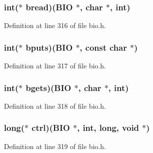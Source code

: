 \subsubsection[{\texorpdfstring{bread}{bread}}]{\setlength{\rightskip}{0pt plus 5cm}int($\ast$ bread)({\bf B\+IO} $\ast$, char $\ast$, int)}\hypertarget{structbio__method__st_a11da462f309fae57ae2132ae6ded814f}{}\label{structbio__method__st_a11da462f309fae57ae2132ae6ded814f}


Definition at line 316 of file bio.\+h.

\subsubsection[{\texorpdfstring{bputs}{bputs}}]{\setlength{\rightskip}{0pt plus 5cm}int($\ast$ bputs)({\bf B\+IO} $\ast$, const char $\ast$)}\hypertarget{structbio__method__st_a5d479bf01f29d87cd8bcc2dd72dede43}{}\label{structbio__method__st_a5d479bf01f29d87cd8bcc2dd72dede43}


Definition at line 317 of file bio.\+h.

\subsubsection[{\texorpdfstring{bgets}{bgets}}]{\setlength{\rightskip}{0pt plus 5cm}int($\ast$ bgets)({\bf B\+IO} $\ast$, char $\ast$, int)}\hypertarget{structbio__method__st_a784cc94a819cc79e25adf02ce34c762b}{}\label{structbio__method__st_a784cc94a819cc79e25adf02ce34c762b}


Definition at line 318 of file bio.\+h.

\subsubsection[{\texorpdfstring{ctrl}{ctrl}}]{\setlength{\rightskip}{0pt plus 5cm}long($\ast$ ctrl)({\bf B\+IO} $\ast$, int, long, {\bf void} $\ast$)}\hypertarget{structbio__method__st_a5a79d5b0f349eec2bb356e769bbe0a2b}{}\label{structbio__method__st_a5a79d5b0f349eec2bb356e769bbe0a2b}


Definition at line 319 of file bio.\+h.

